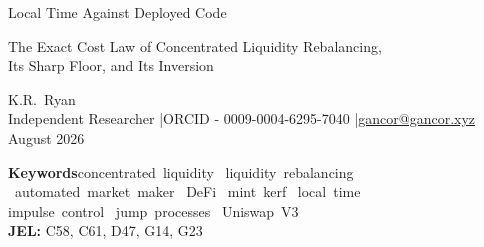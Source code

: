 \documentclass[11pt,a4paper]{article}
\theoremstyle{definition}
\theoremstyle{plain}
\theoremstyle{remark}
\begin{document}
\sloppy
\thispagestyle{plain}

\begin{center}
{\fontsize{25pt}{29pt}\selectfont Local Time Against Deployed Code}\\[16pt]
{\fontsize{17pt}{18pt}\selectfont The Exact Cost Law of Concentrated Liquidity Rebalancing,\\[10pt]
Its Sharp Floor, and Its Inversion\strut}

\vspace{14pt}
{\large K.R.\ Ryan}\\[4pt]
{\fontsize{9pt}{11pt}\selectfont Independent Researcher \quad|\quad ORCID - 0009-0004-6295-7040 \quad|\quad \href{mailto:gancor@gancor.xyz}{gancor@gancor.xyz}}\\[4pt]
{\fontsize{9pt}{11pt}\selectfont August 2026}

\vspace{8pt}
{\fontsize{9pt}{11pt}\selectfont
\textbf{Keywords}\hspace{0.6em}concentrated~liquidity \textperiodcentered\ liquidity~rebalancing \textperiodcentered\ automated~market~maker \textperiodcentered\ DeFi \textperiodcentered\ mint~kerf \textperiodcentered\ local~time \\
impulse~control \textperiodcentered\ jump~processes \textperiodcentered\ Uniswap~V3\\[4pt]
\textbf{JEL:} C58, C61, D47, G14, G23}
\end{center}

\vspace{1.5pt}
\centerline{\scalebox{1.5}{$\therefore$}}
\vspace{14pt}
\end{document}
